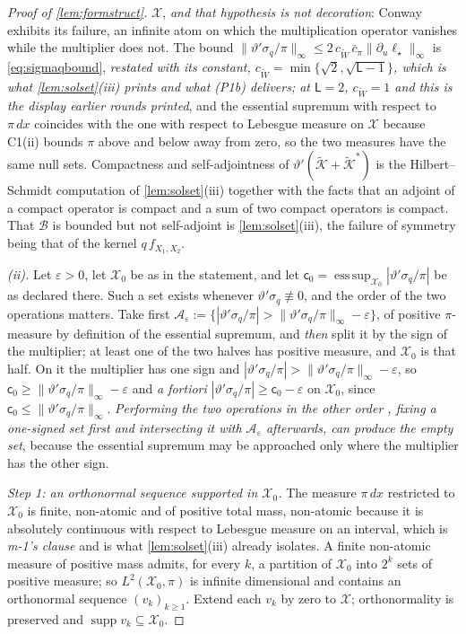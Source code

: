 \begin{proof}[Proof of \cref{lem:formstruct}]
$\mathcal X$, \emph{and that hypothesis is not decoration}: Conway exhibits its failure, an infinite
atom on which the multiplication operator vanishes while the multiplier does not. The bound
$\|\vartheta'\sigma_q/\pi\|_\infty\le2\,c_{\widetilde W}\,\bar c_\pi\|\partial_u\ell_\star\|_\infty$ is
\eqref{eq:sigmaqbound}, \emph{restated with its constant, $c_{\widetilde W}=\min\{\sqrt2,\sqrt{\mathsf L-1}\}$,
which is what \cref{lem:solset}\textup{(iii)} prints and what \textup{(P1b)} delivers; at
$\mathsf L=2$, $c_{\widetilde W}=1$ and this is the display earlier rounds printed}, and the
essential supremum with respect to $\pi\,dx$ coincides with the one with respect to Lebesgue measure on
$\mathcal X$ because C1(ii) bounds $\pi$ above and below away from zero, so the two measures have the same
null sets. Compactness and self-adjointness of $\vartheta'(\tilde{\mathcal K}+\tilde{\mathcal K}^{\ast})$
is the Hilbert--Schmidt computation of \cref{lem:solset}(iii) together with the facts that an adjoint of a
compact operator is compact and a sum of two compact operators is compact. That $\mathcal B$ is bounded but
not self-adjoint is \cref{lem:solset}(iii), the failure of symmetry being that of the kernel
$q\,f_{X_1,X_2}$.

\emph{(ii).} Let $\varepsilon>0$, let $\mathcal X_0$ be as in the statement, and let
$\mathsf c_0=\operatorname*{ess\,sup}_{\mathcal X_0}|\vartheta'\sigma_q/\pi|$ be as declared there.
Such a set exists whenever $\vartheta'\sigma_q\not\equiv0$, and the order of the two operations
matters. Take first
$\mathcal A_\varepsilon:=\{|\vartheta'\sigma_q/\pi|>\|\vartheta'\sigma_q/\pi\|_\infty-\varepsilon\}$, of
positive $\pi$-measure by definition of the essential supremum, and \emph{then} split it by the sign of
the multiplier; at least one of the two halves has positive measure, and $\mathcal X_0$ is that half. On
it the multiplier has one sign and
$|\vartheta'\sigma_q/\pi|>\|\vartheta'\sigma_q/\pi\|_\infty-\varepsilon$, so
$\mathsf c_0\ge\|\vartheta'\sigma_q/\pi\|_\infty-\varepsilon$ and \emph{a fortiori}
$|\vartheta'\sigma_q/\pi|\ge\mathsf c_0-\varepsilon$ on $\mathcal X_0$, since
$\mathsf c_0\le\|\vartheta'\sigma_q/\pi\|_\infty$. \emph{Performing the two operations in the other order
, fixing a one-signed set first and intersecting it with $\mathcal A_\varepsilon$ afterwards, can
produce the empty set}, because the essential supremum may be approached only where the multiplier has
the other sign.

\emph{Step 1: an orthonormal sequence supported in $\mathcal X_0$.} The measure $\pi\,dx$ restricted to
$\mathcal X_0$ is finite, non-atomic and of positive total mass, non-atomic because it is absolutely
continuous with respect to Lebesgue measure on an interval, which is \emph{m-1's clause} and is what
\cref{lem:solset}(iii) already isolates. A finite non-atomic measure of positive mass admits, for every
$k$, a partition of $\mathcal X_0$ into $2^{k}$ sets of positive measure; so $L^{2}(\mathcal X_0,\pi)$ is
infinite dimensional and contains an orthonormal sequence $(v_k)_{k\ge1}$. Extend each $v_k$ by zero to
$\mathcal X$; orthonormality is preserved and $\operatorname{supp}v_k\subseteq\mathcal X_0$.


\end{proof}
